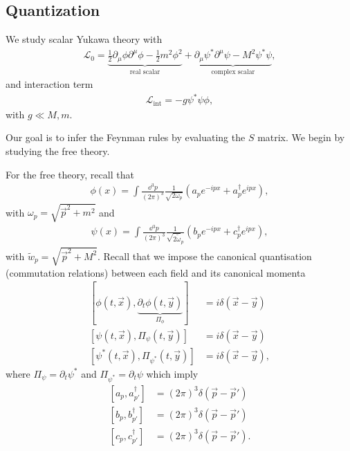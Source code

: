 
\subsection{Quantization}

We study scalar Yukawa theory with
\begin{align}
    \mathcal{L}_0 = \underbrace{\frac{1}{2} \partial_\mu \phi \partial^{\mu} \phi - \frac{1}{2}m^2 \phi^2}_{\text{real scalar}} + \underbrace{\partial_\mu \psi^{*} \partial^{\mu} \psi - M^2 \psi^{*} \psi}_{\text{complex scalar}}
,\end{align}
and interaction term
\begin{align}
    \mathcal{L}_\text{int} = -g \psi^{*} \psi \phi
,\end{align}
with $g \ll M,m$.

Our goal is to infer the Feynman rules by evaluating the $S$ matrix. We begin by studying the free theory.

For the free theory, recall that
\begin{align}
    \phi \left( x \right) = \int \frac{\dd{^3p}}{\left( 2\pi\right)^3} \frac{1}{\sqrt{2\omega_p} } \left( a_p e^{-ipx} + a^{\dag}_p e^{ipx} \right) 
,\end{align}
with $\omega_p = \sqrt{\vec{p}^2 + m^2} $ and
\begin{align}
    \psi \left( x \right) = \int \frac{\dd{^3p}}{\left( 2\pi\right)^3} \frac{1}{\sqrt{2 \widetilde{\omega}}_{p} } \left( b_{p} e^{-ipx} + c^{\dag}_p e^{ipx} \right) 
,\end{align}
with $\widetilde{w}_p= \sqrt{\vec{p}^2 + M^2}$. Recall that we impose the canonical quantisation (commutation relations) between each field and its canonical momenta
\begin{align}
    \left[ \phi \left( t,\vec{x} \right) , \underbrace{\partial_t \phi \left( t, \vec{y} \right)}_{\Pi_{\phi}}  \right]  &= i \delta \left( \vec{x} - \vec{y} \right)  \\
    \left[ \psi \left( t,\vec{x} \right) , \Pi_{\psi}\left( t,\vec{y} \right)  \right]  &= i \delta \left( \vec{x} - \vec{y} \right) \\
    \left[ \psi^{*} \left( t,\vec{x} \right) , \Pi_{\psi^{*}}\left( t,\vec{y} \right)  \right]  &= i \delta \left( \vec{x} - \vec{y} \right) 
,\end{align}
where $\Pi_{\psi} = \partial_t \psi^{*}$ and $\Pi_{\psi^{*}} = \partial_t \psi$ which imply
\begin{align}
    \left[ a_{p}, a^{\dag}_{p'} \right] &= \left( 2\pi \right)^{3} \delta \left( \vec{p} - \vec{p}' \right)  \\
    \left[ b_{p}, b^{\dag}_{p'} \right] &= \left( 2\pi \right)^{3} \delta \left( \vec{p} - \vec{p}' \right)  \\
    \left[ c_{p}, c^{\dag}_{p'} \right] &= \left( 2\pi \right)^{3} \delta \left( \vec{p} - \vec{p}' \right)
.\end{align}

